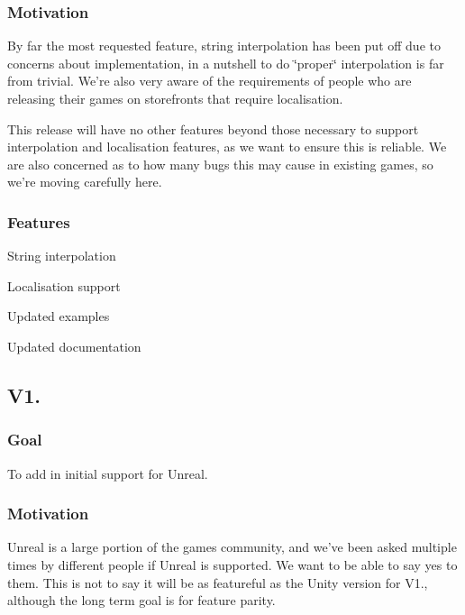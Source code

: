 \subsubsection*{Motivation}

By far the most requested feature, string interpolation has been put off due to concerns about implementation, in a nutshell to do \char`\"{}proper\char`\"{} interpolation is far from trivial. We're also very aware of the requirements of people who are releasing their games on storefronts that require localisation.

This release will have no other features beyond those necessary to support interpolation and localisation features, as we want to ensure this is reliable. We are also concerned as to how many bugs this may cause in existing games, so we're moving carefully here.

\subsubsection*{Features}


\begin{DoxyItemize}
\item String interpolation
\item Localisation support
\item Updated examples
\item Updated documentation
\end{DoxyItemize}

\subsection*{V1.}

\subsubsection*{Goal}

To add in initial support for Unreal.

\subsubsection*{Motivation}

Unreal is a large portion of the games community, and we've been asked multiple times by different people if Unreal is supported. We want to be able to say yes to them. This is not to say it will be as featureful as the Unity version for V1., although the long term goal is for feature parity.

